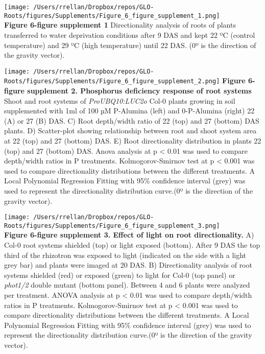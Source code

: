 \documentclass[]{article}
\begin{document}
\texttt{[image: /Users/rrellan/Dropbox/repos/GLO-Roots/figures/Supplements/Figure\_6\_figure\_supplement\_1.png]}\\\textbf{Figure
6-figure supplement 1} Directionality analysis of roots of plants
transferred to water deprivation conditions after 9 DAS and kept 22 ºC
(control temperature) and 29 ºC (high temperature) until 22 DAS. (0º is
the direction of the gravity vector).\\\pagebreak

\texttt{[image: /Users/rrellan/Dropbox/repos/GLO-Roots/figures/Supplements/Figure\_6\_figure\_supplement\_2.png]}
\textbf{Figure 6-figure supplement 2. Phosphorus deficiency response of
root systems} Shoot and root systems of \emph{ProUBQ10:LUC2o} Col-0
plants growing in soil supplemented with 1ml of 100 µM P-Alumina (left)
and 0-P-Alumina (right) 22 (A) or 27 (B) DAS. C) Root depth/width ratio
of 22 (top) and 27 (bottom) DAS plants. D) Scatter-plot showing
relationship between root and shoot system area at 22 (top) and 27
(bottom) DAS. E) Root directionality distribution in plants 22 (top) and
27 (bottom) DAS. Anova analysis at p \textless{} 0.01 was used to
compare depth/width ratios in P treatments. Kolmogorov-Smirnov test at p
\textless{} 0.001 was used to compare directionality distributions
between the different treatments. A Local Polynomial Regression Fitting
with 95\% confidence interval (grey) was used to represent the
directionality distribution curve.(0º is the direction of the gravity
vector).\\\pagebreak

\texttt{[image: /Users/rrellan/Dropbox/repos/GLO-Roots/figures/Supplements/Figure\_6\_figure\_supplement\_3.png]}\\\textbf{Figure
6-figure supplement 3. Effect of light on root directionality.} A) Col-0
root systems shielded (top) or light exposed (bottom). After 9 DAS the
top third of the rhizotron was exposed to light (indicated on the side
with a light grey bar) and plants were imaged at 20 DAS. B)
Directionality analysis of root systems shielded (red) or exposed
(green) to light for Col-0 (top panel) or \emph{phot1/2} double mutant
(bottom panel). Between 4 and 6 plants were analyzed per treatment.
ANOVA analysis at p \textless{} 0.01 was used to compare depth/width
ratios in P treatments. Kolmogorov-Smirnov test at p \textless{} 0.001
was used to compare directionality distributions between the different
treatments. A Local Polynomial Regression Fitting with 95\% confidence
interval (grey) was used to represent the directionality distribution
curve.(0º is the direction of the gravity vector). \pagebreak
\end{document}
